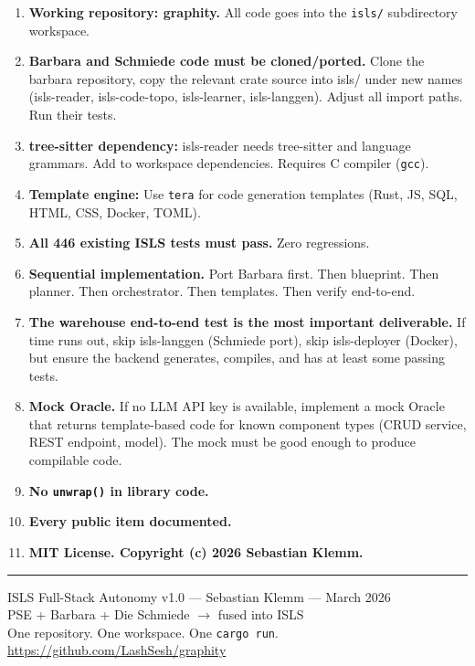 \documentclass[11pt,a4paper]{article}
\begin{document}
\begin{enumerate}
\item \textbf{Working repository: graphity.} All code goes into
  the \texttt{isls/} subdirectory workspace.

\item \textbf{Barbara and Schmiede code must be cloned/ported.}
  Clone the barbara repository, copy the relevant crate source
  into isls/ under new names (isls-reader, isls-code-topo,
  isls-learner, isls-langgen). Adjust all import paths. Run
  their tests.

\item \textbf{tree-sitter dependency:} isls-reader needs tree-sitter
  and language grammars. Add to workspace dependencies. Requires
  C compiler (\texttt{gcc}).

\item \textbf{Template engine:} Use \texttt{tera} for code generation
  templates (Rust, JS, SQL, HTML, CSS, Docker, TOML).

\item \textbf{All 446 existing ISLS tests must pass.} Zero regressions.

\item \textbf{Sequential implementation.} Port Barbara first. Then
  blueprint. Then planner. Then orchestrator. Then templates. Then
  verify end-to-end.

\item \textbf{The warehouse end-to-end test is the most important
  deliverable.} If time runs out, skip isls-langgen (Schmiede port),
  skip isls-deployer (Docker), but ensure the backend generates,
  compiles, and has at least some passing tests.

\item \textbf{Mock Oracle.} If no LLM API key is available, implement
  a mock Oracle that returns template-based code for known component
  types (CRUD service, REST endpoint, model). The mock must be good
  enough to produce compilable code.

\item \textbf{No \texttt{unwrap()} in library code.}

\item \textbf{Every public item documented.}

\item \textbf{MIT License. Copyright (c) 2026 Sebastian Klemm.}
\end{enumerate}

\vfill
\noindent\rule{\textwidth}{0.4pt}
\begin{center}
\small
ISLS Full-Stack Autonomy v1.0 --- Sebastian Klemm --- March 2026\\
PSE + Barbara + Die Schmiede $\rightarrow$ fused into ISLS\\
One repository. One workspace. One \texttt{cargo run}.\\
\url{https://github.com/LashSesh/graphity}
\end{center}
\end{document}
